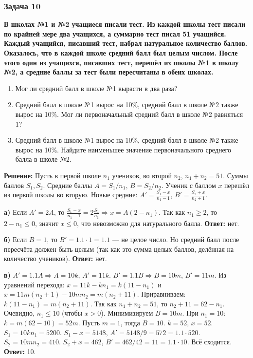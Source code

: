 \documentclass[12pt, a4paper]{article}
\begin{document}
\subsubsection*{Задача 10}
\textbf{В школах №1 и №2 учащиеся писали тест. Из каждой школы тест писали по крайней мере два учащихся, а суммарно тест писал 51 учащийся. Каждый учащийся, писавший тест, набрал натуральное количество баллов. Оказалось, что в каждой школе средний балл был целым числом. После этого один из учащихся, писавших тест, перешёл из школы №1 в школу №2, а средние баллы за тест были пересчитаны в обеих школах.}
\begin{enumerate}[label=\alph*)]
    \item Мог ли средний балл в школе №1 вырасти в два раза?
    \item Средний балл в школе №1 вырос на 10\%, средний балл в школе №2 также вырос на 10\%. Мог ли первоначальный средний балл в школе №2 равняться 1?
    \item Средний балл в школе №1 вырос на 10\%, средний балл в школе №2 также вырос на 10\%. Найдите наименьшее значение первоначального среднего балла в школе №2.
\end{enumerate}

\textbf{Решение:}
Пусть в первой школе \(n_1\) учеников, во второй \(n_2\), \(n_1+n_2=51\). Суммы баллов \(S_1, S_2\). Средние баллы \(A = S_1/n_1\), \(B = S_2/n_2\). Ученик с баллом \(x\) перешёл из первой школы во вторую.
Новые средние: \(A' = \frac{S_1-x}{n_1-1}\), \(B' = \frac{S_2+x}{n_2+1}\).

\textbf{а)} Если \(A' = 2A\), то \(\frac{S_1-x}{n_1-1} = 2\frac{S_1}{n_1} \Rightarrow x = A(2-n_1)\). Так как \(n_1 \ge 2\), то \(2-n_1 \le 0\), значит \(x \le 0\), что невозможно для натурального балла.
\textbf{Ответ:} нет.

\textbf{б)} Если \(B=1\), то \(B' = 1.1 \cdot 1 = 1.1\) — не целое число. Но средний балл после пересчёта должен быть целым (так как это сумма целых баллов, делённая на количество учеников).
\textbf{Ответ:} нет.

\textbf{в)} \(A' = 1.1A \Rightarrow A = 10k\), \(A' = 11k\). \(B' = 1.1B \Rightarrow B = 10m\), \(B' = 11m\).
Из уравнений перехода: \(x = 11k - kn_1 = k(11-n_1)\) и \(x = 11m(n_2+1) - 10mn_2 = m(n_2+11)\).
Приравниваем: \(k(11-n_1) = m(n_2+11)\). Так как \(n_1+n_2=51\), то \(n_2+11 = 62-n_1\).
Очевидно, \(n_1 \le 10\) (чтобы \(x>0\)). Минимизируем \(B = 10m\).
При \(n_1 = 10\): \(k = m(62-10) = 52m\).
Пусть \(m=1\), тогда \(B=10\). \(k=52\), \(x=52\). \(S_1 = 10k n_1 = 5200\). \(S_1 - x = 5148\), \(A' = 5148/9 = 572 = 1.1 \cdot 520\). \(S_2 = 10m n_2 = 410\). \(S_2 + x = 462\), \(B' = 462/42 = 11 = 1.1 \cdot 10\). Всё сходится.
\textbf{Ответ:} 10.
\end{document}

